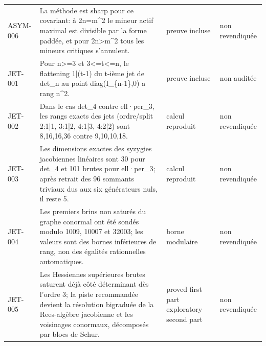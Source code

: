 \begin{longtable}{@{}>{\raggedright\arraybackslash}p{1.6cm}>{\raggedright\arraybackslash}p{8.4cm}>{\raggedright\arraybackslash}p{2.5cm}>{\raggedright\arraybackslash}p{2.0cm}@{}}
ASYM-006 & La méthode est sharp pour ce covariant: à 2n=m\textasciicircum{}2 le mineur actif maximal est divisible par la forme paddée, et pour 2n>m\textasciicircum{}2 tous les mineurs critiques s'annulent. & preuve incluse & non revendiquée \\
JET-001 & Pour n>=3 et 3<=t<=n, le flattening 1|(t-1) du t-ième jet de det\_n au point diag(I\_\{n-1\},0) a rang n\textasciicircum{}2. & preuve incluse & non auditée \\
JET-002 & Dans le cas det\_4 contre ell·per\_3, les rangs exacts des jets (ordre/split 2:1|1, 3:1|2, 4:1|3, 4:2|2) sont 8,16,16,36 contre 9,10,10,18. & calcul reproduit & non revendiquée \\
JET-003 & Les dimensions exactes des syzygies jacobiennes linéaires sont 30 pour det\_4 et 101 brutes pour ell·per\_3; après retrait des 96 sommants triviaux dus aux six générateurs nuls, il reste 5. & calcul reproduit & non revendiquée \\
JET-004 & Les premiers brins non saturés du graphe conormal ont été sondés modulo 1009, 10007 et 32003; les valeurs sont des bornes inférieures de rang, non des égalités rationnelles automatiques. & borne modulaire & non revendiquée \\
JET-005 & Les Hessiennes supérieures brutes saturent déjà côté déterminant dès l'ordre 3; la piste recommandée devient la résolution bigraduée de la Rees-algèbre jacobienne et les voisinages conormaux, décomposés par blocs de Schur. & proved first part exploratory second part & non revendiquée \\
\bottomrule
\end{longtable}
